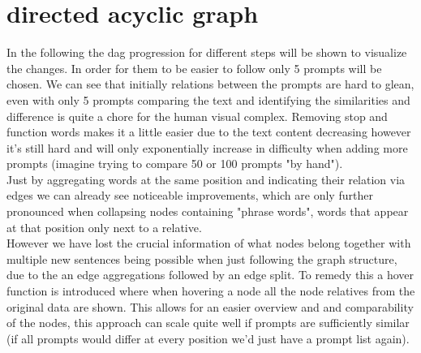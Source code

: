 \documentclass[
  a4paper,  %
  twoside,  %
  bibliography=totoc,
  headsepline,
  cleardoublepage=empty,
  parskip=half,
  draft=false
]{scrbook}
\begin{document}
\section{directed acyclic graph}
In the following the dag progression for different steps will be shown to visualize the changes. In order for them to be easier to follow only 5 prompts will be chosen. We can see that initially relations between the prompts are hard to glean, even with only 5 prompts comparing the text and identifying the similarities and difference is quite a chore for the human visual complex. Removing stop and function words makes it a little easier due to the text content decreasing however it's still hard and will only exponentially increase in difficulty when adding more prompts (imagine trying to compare 50 or 100 prompts "by hand").\\
Just by aggregating words at the same position and indicating their relation via edges we can already see noticeable improvements, which are only further pronounced when collapsing nodes containing "phrase words", words that appear at that position only next to a relative.\\
However we have lost the crucial information of what nodes belong together with multiple new sentences being possible when just following the graph structure, due to the an edge aggregations followed by an edge split. To remedy this a hover function is introduced where when hovering a node all the node relatives from the original data are shown. This allows for an easier overview and and comparability of the nodes, this approach can scale quite well if prompts are sufficiently similar (if all prompts would differ at every position we'd just have a prompt list again).
\end{document}
